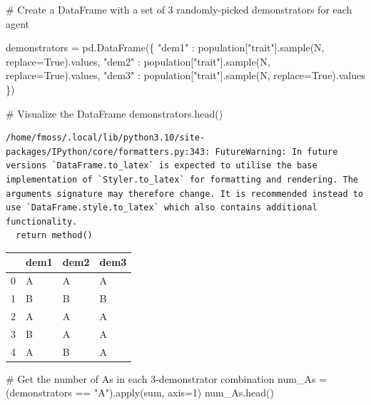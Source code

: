 \documentclass[
  a4paperpaper,
  ,captions=tableheading
]{scrbook}
\newenvironment{Shaded}{\begin{snugshade}}{\end{snugshade}}
\newcommand{\BuiltInTok}[1]{\textcolor[rgb]{0.00,0.23,0.31}{#1}}
\newcommand{\CommentTok}[1]{\textcolor[rgb]{0.37,0.37,0.37}{#1}}
\newcommand{\DecValTok}[1]{\textcolor[rgb]{0.68,0.00,0.00}{#1}}
\newcommand{\NormalTok}[1]{\textcolor[rgb]{0.00,0.23,0.31}{#1}}
\newcommand{\OperatorTok}[1]{\textcolor[rgb]{0.37,0.37,0.37}{#1}}
\newcommand{\StringTok}[1]{\textcolor[rgb]{0.13,0.47,0.30}{#1}}
\newcommand{\VariableTok}[1]{\textcolor[rgb]{0.07,0.07,0.07}{#1}}
\begin{document}
\begin{Shaded}
\begin{Highlighting}[]
\CommentTok{\# Create a DataFrame with a set of 3 randomly{-}picked demonstrators for each agent}

\NormalTok{demonstrators }\OperatorTok{=}\NormalTok{ pd.DataFrame(\{}
    \StringTok{"dem1"}\NormalTok{ : population[}\StringTok{"trait"}\NormalTok{].sample(N, replace}\OperatorTok{=}\VariableTok{True}\NormalTok{).values,}
    \StringTok{"dem2"}\NormalTok{ : population[}\StringTok{"trait"}\NormalTok{].sample(N, replace}\OperatorTok{=}\VariableTok{True}\NormalTok{).values,}
    \StringTok{"dem3"}\NormalTok{ : population[}\StringTok{"trait"}\NormalTok{].sample(N, replace}\OperatorTok{=}\VariableTok{True}\NormalTok{).values}
\NormalTok{\})}
\end{Highlighting}
\end{Shaded}

\begin{Shaded}
\begin{Highlighting}[]
\CommentTok{\# Visualize the DataFrame}
\NormalTok{demonstrators.head()}
\end{Highlighting}
\end{Shaded}

\begin{verbatim}
/home/fmoss/.local/lib/python3.10/site-packages/IPython/core/formatters.py:343: FutureWarning: In future versions `DataFrame.to_latex` is expected to utilise the base implementation of `Styler.to_latex` for formatting and rendering. The arguments signature may therefore change. It is recommended instead to use `DataFrame.style.to_latex` which also contains additional functionality.
  return method()
\end{verbatim}

\begin{tabular}{llll}
\toprule
{} & dem1 & dem2 & dem3 \\
\midrule
0 &    A &    A &    A \\
1 &    B &    B &    B \\
2 &    A &    A &    A \\
3 &    B &    A &    A \\
4 &    A &    B &    A \\
\bottomrule
\end{tabular}

\begin{Shaded}
\begin{Highlighting}[]
\CommentTok{\# Get the number of A\textquotesingle{}s in each 3{-}demonstrator combination}
\NormalTok{num\_As }\OperatorTok{=}\NormalTok{ (demonstrators }\OperatorTok{==} \StringTok{"A"}\NormalTok{).}\BuiltInTok{apply}\NormalTok{(}\BuiltInTok{sum}\NormalTok{, axis}\OperatorTok{=}\DecValTok{1}\NormalTok{)}
\NormalTok{num\_As.head()}
\end{Highlighting}
\end{Shaded}
\end{document}
